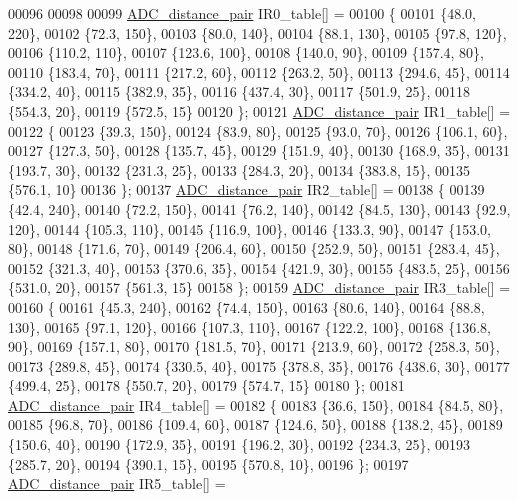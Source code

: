 \begin{DoxyCode}
00096 
00098 
00099 \hyperlink{struct_a_d_c__distance__pair}{ADC\_distance\_pair} IR0\_table[] =
00100 \{
00101     \{48.0, 220\},
00102     \{72.3, 150\},
00103     \{80.0, 140\},
00104     \{88.1, 130\},
00105     \{97.8, 120\},
00106     \{110.2, 110\},
00107     \{123.6, 100\},
00108     \{140.0, 90\},
00109     \{157.4, 80\},
00110     \{183.4, 70\},
00111     \{217.2, 60\},
00112     \{263.2, 50\},
00113     \{294.6, 45\},
00114     \{334.2, 40\},
00115     \{382.9, 35\},
00116     \{437.4, 30\},
00117     \{501.9, 25\},
00118     \{554.3, 20\},
00119     \{572.5, 15\}
00120 \};
00121 \hyperlink{struct_a_d_c__distance__pair}{ADC\_distance\_pair} IR1\_table[] =
00122 \{
00123     \{39.3, 150\},
00124     \{83.9, 80\},
00125     \{93.0, 70\},
00126     \{106.1, 60\},
00127     \{127.3, 50\},
00128     \{135.7, 45\},
00129     \{151.9, 40\},
00130     \{168.9, 35\},
00131     \{193.7, 30\},
00132     \{231.3, 25\},
00133     \{284.3, 20\},
00134     \{383.8, 15\},
00135     \{576.1, 10\}
00136 \};
00137 \hyperlink{struct_a_d_c__distance__pair}{ADC\_distance\_pair} IR2\_table[] =
00138 \{
00139     \{42.4, 240\},
00140     \{72.2, 150\},
00141     \{76.2, 140\},
00142     \{84.5, 130\},
00143     \{92.9, 120\},
00144     \{105.3, 110\},
00145     \{116.9, 100\},
00146     \{133.3, 90\},
00147     \{153.0, 80\},
00148     \{171.6, 70\},
00149     \{206.4, 60\},
00150     \{252.9, 50\},
00151     \{283.4, 45\},
00152     \{321.3, 40\},
00153     \{370.6, 35\},
00154     \{421.9, 30\},
00155     \{483.5, 25\},
00156     \{531.0, 20\},
00157     \{561.3, 15\}
00158 \};
00159 \hyperlink{struct_a_d_c__distance__pair}{ADC\_distance\_pair} IR3\_table[] =
00160 \{
00161     \{45.3, 240\},
00162     \{74.4, 150\},
00163     \{80.6, 140\},
00164     \{88.8, 130\},
00165     \{97.1, 120\},
00166     \{107.3, 110\},
00167     \{122.2, 100\},
00168     \{136.8, 90\},
00169     \{157.1, 80\},
00170     \{181.5, 70\},
00171     \{213.9, 60\},
00172     \{258.3, 50\},
00173     \{289.8, 45\},
00174     \{330.5, 40\},
00175     \{378.8, 35\},
00176     \{438.6, 30\},
00177     \{499.4, 25\},
00178     \{550.7, 20\},
00179     \{574.7, 15\}
00180 \};
00181 \hyperlink{struct_a_d_c__distance__pair}{ADC\_distance\_pair} IR4\_table[] =
00182 \{
00183     \{36.6, 150\},
00184     \{84.5, 80\},
00185     \{96.8, 70\},
00186     \{109.4, 60\},
00187     \{124.6, 50\},
00188     \{138.2, 45\},
00189     \{150.6, 40\},
00190     \{172.9, 35\},
00191     \{196.2, 30\},
00192     \{234.3, 25\},
00193     \{285.7, 20\},
00194     \{390.1, 15\},
00195     \{570.8, 10\},
00196 \};
00197 \hyperlink{struct_a_d_c__distance__pair}{ADC\_distance\_pair} IR5\_table[] =

\end{DoxyCode}
